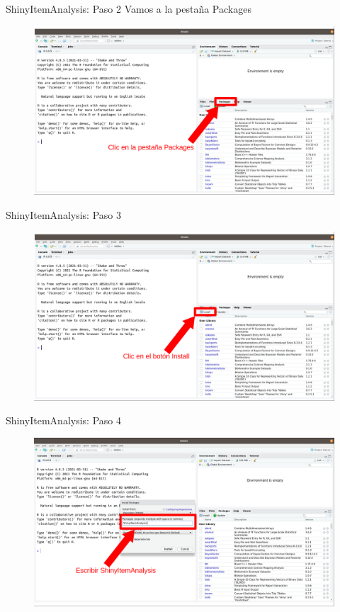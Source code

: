\documentclass{beamer}
\begin{document}
\begin{frame}{ShinyItemAnalysis: Paso 2}
Vamos a la pestaña Packages
\begin{figure}
\centering
\includegraphics[width=.92\textwidth]{Paso1.png}
\end{figure}  
\end{frame}

\begin{frame}{ShinyItemAnalysis: Paso 3}
\begin{figure}
\centering
\includegraphics[width=.92\textwidth]{Paso2.png}
\end{figure}  
\end{frame}

\begin{frame}{ShinyItemAnalysis: Paso 4}
\begin{figure}
\centering
\includegraphics[width=.92\textwidth]{Paso3.png}
\end{figure}  
\end{frame}
\end{document}
